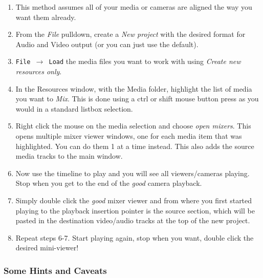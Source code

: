 \begin{enumerate}
    \item This method assumes all of your media or cameras are aligned the way you want them already.
    \item From the \textit{File} pulldown, create a \textit{New project} with the desired format for Audio and Video output (or you can just use the default).
    \item \texttt{File $\rightarrow$ Load} the media files you want to work with using \textit{Create new resources only}.
    \item In the Resources window, with  the Media folder, highlight the list of media you want to \textit{Mix}. This is done using a ctrl or shift mouse button press as you would in a standard listbox selection.
    \item Right click the mouse on the media selection and choose \textit{open mixers}. This opens multiple mixer viewer windows, one for each media item that was highlighted.  You can
    do them 1 at a time instead.  This also adds the source media tracks to the main window.
    \item Now use the timeline to play and you will see all viewers/cameras playing.  Stop when you get to the
    end of the \textit{good} camera playback.
    \item Simply double click the \textit{good} mixer viewer and from where you first started playing to the playback insertion pointer is the source section, which will be pasted in the destination video/audio tracks at the top of the new project.
    \item Repeat steps 6-7.  Start playing again, stop when you want, double click the desired mini-viewer!
\end{enumerate}

\subsubsection*{Some Hints and Caveats}%
\label{ssub:hints_caveats}

